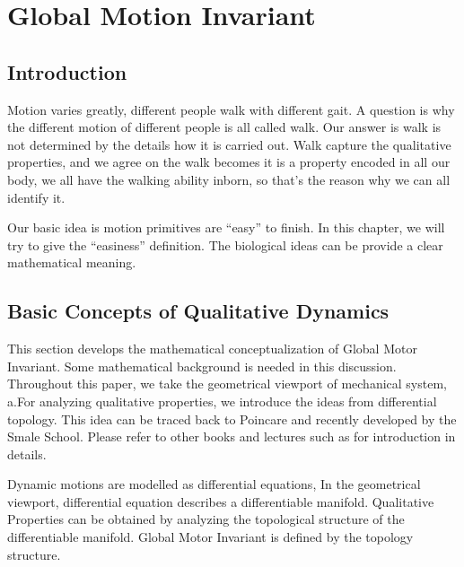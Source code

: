 \chapter{Global Motion Invariant}
\section{Introduction}

\ifpdf
    \graphicspath{{GlobalInvariant/GlobalInvariantFigs/PNG/}{GlobalInvariant/GlobalInvariantFigs/PDF/}{GlobalInvariant/GlobalInvariantFigs/}}
\else
    \graphicspath{{GlobalInvariant/GlobalInvariantFigs/EPS/}{GlobalInvariant/GlobalInvariantFigs/}}
\fi

Motion varies greatly, different people walk with different gait. 
A question is why the different motion of different people is all called walk.
Our answer is walk is not determined by the details how it is carried out.
Walk capture the qualitative properties, and we agree on the walk becomes it is a property encoded in all our body, we all have the walking ability inborn, so that’s the reason why we can all identify it.


Our basic idea is motion primitives are “easy” to finish. 
In this chapter, we will try to give the “easiness” definition.
The biological ideas can be provide a clear mathematical meaning.


\section{Basic Concepts of Qualitative Dynamics}
This section develops the mathematical conceptualization of Global Motor Invariant.
Some mathematical background is needed in this discussion.
Throughout this paper, we take the geometrical viewport of mechanical system, a.For analyzing qualitative properties, we introduce the ideas from differential topology.
This idea can be traced back to Poincare\citep{Poincar'e1899,Poincar'e1885} and recently developed by the Smale School.
Please refer to other books and lectures such as \citep{abraham1978foundations}for introduction in details.


Dynamic motions are modelled as differential equations,
In the geometrical viewport, differential equation describes a differentiable manifold.
Qualitative Properties can be obtained by analyzing the topological structure of the differentiable manifold.
Global Motor Invariant is defined by the topology structure.



